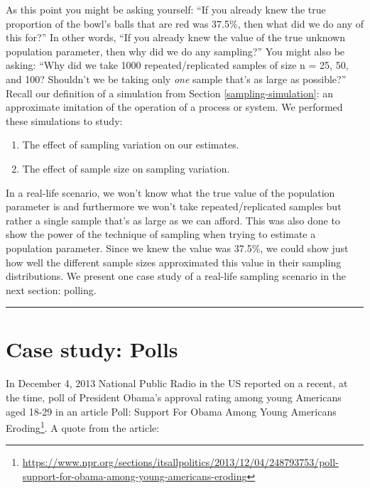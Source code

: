 \documentclass[12pt, krantz2,]{krantz}
\providecommand{\tightlist}{%
  \setlength{\itemsep}{0pt}\setlength{\parskip}{0pt}}
\renewcommand{\href}[2]{#2\footnote{\url{#1}}}
\begin{document}
As this point you might be asking yourself: ``If you already knew the true proportion of the bowl's balls that are red was 37.5\%, then what did we do any of this for?'' In other words, ``If you already knew the value of the true unknown population parameter, then why did we do any sampling?'' You might also be asking: ``Why did we take 1000 repeated/replicated samples of size n = 25, 50, and 100? Shouldn't we be taking only \emph{one} sample that's as large as possible?'' Recall our definition of a simulation from Section \ref{sampling-simulation}: an approximate imitation of the operation of a process or system. We performed these simulations to study:

\begin{enumerate}
\def\labelenumi{\arabic{enumi}.}
\tightlist
\item
  The effect of sampling variation on our estimates.
\item
  The effect of sample size on sampling variation.
\end{enumerate}

In a real-life scenario, we won't know what the true value of the population parameter is and furthermore we won't take repeated/replicated samples but rather a single sample that's as large as we can afford. This was also done to show the power of the technique of sampling when trying to estimate a population parameter. Since we knew the value was 37.5\%, we could show just how well the different sample sizes approximated this value in their sampling distributions. We present one case study of a real-life sampling scenario in the next section: polling.

\begin{center}\rule{0.5\linewidth}{\linethickness}\end{center}

\hypertarget{sampling-case-study}{%
\section{Case study: Polls}\label{sampling-case-study}}

In December 4, 2013 National Public Radio in the US reported on a recent, at the time, poll of President Obama's approval rating among young Americans aged 18-29 in an article \href{https://www.npr.org/sections/itsallpolitics/2013/12/04/248793753/poll-support-for-obama-among-young-americans-eroding}{Poll: Support For Obama Among Young Americans Eroding}. A quote from the article:
\end{document}
